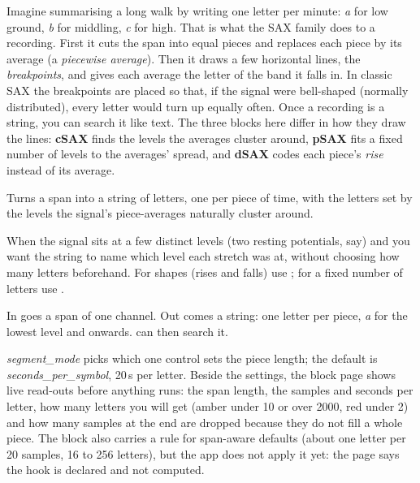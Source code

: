 \begin{plainterms}
Imagine summarising a long walk by writing one letter per minute: \emph{a} for low ground,
\emph{b} for middling, \emph{c} for high. That is what the SAX family does to a recording.
First it cuts the span into equal pieces and replaces each piece by its average (a
\emph{piecewise average}). Then it draws a few horizontal lines, the \emph{breakpoints}, and
gives each average the letter of the band it falls in. In classic SAX
\citep{lin2003symbolic} the breakpoints are placed so that, if the signal were bell-shaped
(normally distributed), every letter would turn up equally often. Once a recording is a
string, you can search it like text. The three blocks here differ in how they draw the
lines: \textbf{cSAX} finds the levels the averages cluster around, \textbf{pSAX} fits a
fixed number of levels to the averages' spread, and \textbf{dSAX} codes each piece's
\emph{rise} instead of its average.
\end{plainterms}

Turns a span into a string of letters, one per piece of time, with the letters set by the
levels the signal's piece-averages naturally cluster around.

When the signal sits at a few distinct levels (two resting potentials, say) and you want the
string to name which level each stretch was at, without choosing how many letters
beforehand. For shapes (rises and falls) use ; for a fixed
number of letters use .

In goes a span of one channel. Out comes a string: one letter per piece, \emph{a} for the
lowest level and onwards.  can then search it.

\emph{segment\_mode} picks which one control sets the piece length; the default is
\emph{seconds\_per\_symbol}, 20\,s per letter. Beside the settings, the block page shows
live read-outs before anything runs: the span length, the samples and seconds per letter,
how many letters you will get (amber under 10 or over 2000, red under 2) and how many samples
at the end are dropped because they do not fill a whole piece. The block also carries a rule
for span-aware defaults (about one letter per 20 samples, 16 to 256 letters), but the app
does not apply it yet: the page says the hook is declared and not computed.

